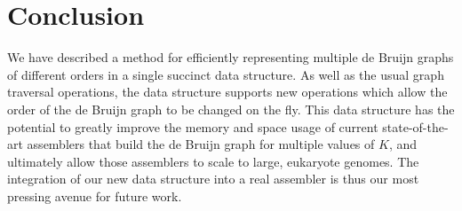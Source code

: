 \section{Conclusion}\label{sec:conclusion}

We have described a method for efficiently representing multiple de Bruijn graphs 
of different orders in a single succinct data structure. As well as the usual graph 
traversal operations, the data structure supports new operations which allow the order 
of the de Bruijn graph to be changed on the fly. This data structure has the potential 
to greatly improve the memory and space usage of current state-of-the-art assemblers 
that build the de Bruijn graph for multiple values of $K$, and ultimately allow those
assemblers to scale to large, eukaryote genomes. The integration of our new data 
structure into a real assembler is thus our most pressing avenue for future work.
